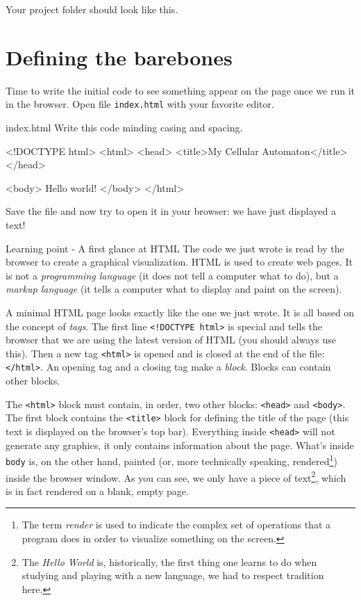 %
\begin{marginfigure}
  
  \caption[Project folder structure]{Your project folder should look like this.}
  \label{fig:dirstruct1}
\end{marginfigure}
%

\section{Defining the barebones}
Time to write the initial code to see something appear on the page once we run it in the browser.
Open file \texttt{index.html} with your favorite editor.

\begin{programcode}{index.html}
Write this code minding casing and spacing.
\begin{codehtml}
<!DOCTYPE html>
<html>
<head>
  <title>My Cellular Automaton</title>
</head>

<body>
  Hello world!
</body>
</html>
\end{codehtml}
\end{programcode}

Save the file and now try to open it in your browser: we have just displayed a text!

\begin{tips}{Learning point - A first glance at HTML}
The code we just wrote is read by the browser to create a graphical visualization. HTML is used to
create web pages. It is not a \textit{programming language} (it does not tell a computer what to do),
but a \textit{markup language} (it tells a computer what to display and paint on the screen).

A minimal HTML page looks exactly like the one we just wrote.
It is all based on the concept of \textit{tags}. The
first line \texttt{<!DOCTYPE html>} is special and tells the browser that we are using the latest
version of HTML (you should always use this). Then a new tag \texttt{<html>} is opened and is
closed at the end of the file: \texttt{</html>}. An opening tag and a closing tag make a \textit{block}.
Blocks can contain other blocks.

The \texttt{<html>} block must contain, in order, two other blocks:
\texttt{<head>} and \texttt{<body>}. The first block contains the \texttt{<title>}
block for defining the title of the page
(this text is displayed on the browser's top bar). Everything inside \texttt{<head>} will not generate any 
graphics, it only contains information about the page. What's inside \texttt{body} is, on the other hand, 
painted (or, more technically speaking, rendered\footnote{The term \textit{render} is used to indicate
the complex set of operations that a program does in order to visualize something on the screen.})
inside the browser window. As you can see, we only have a piece of 
text\footnote{The \textit{Hello World} is, historically, the first thing one learns
to do when studying and playing with a new language, we had to respect tradition here.}, which
is in fact rendered on a blank, empty page.
\end{tips}

